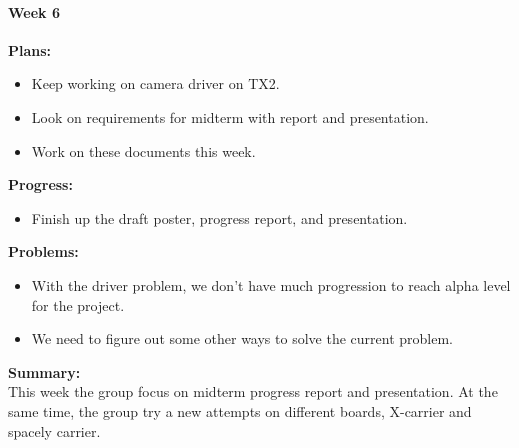 \paragraph{Week 6}
\begin{adjustwidth}{2.5em}{0pt}
    \vspace{-0.5cm}\textbf{Plans:}
    \vspace{-0.5cm}
    \begin{itemize}
        \item Keep working on camera driver on TX2. 
        \item Look on requirements for midterm with report and presentation.
        \item Work on these documents this week. 
    \end{itemize} 
    \vspace{-0.3cm}\textbf{Progress:}
    \vspace{-0.5cm}
    \begin{itemize}
        \item Finish up the draft poster, progress report, and presentation. 
    \end{itemize} 
    \vspace{-0.3cm}\textbf{Problems:}
    \vspace{-0.5cm}
    \begin{itemize}
        \item With the driver problem, we don't have much progression to reach alpha level for the project.
        \item We need to figure out some other ways to solve the current problem.
    \end{itemize}  
    \vspace{-0.3cm}\noindent\textbf{Summary:}\\
    \noindent This week the group focus on midterm progress report and presentation. At the same time, the group 
    try a new attempts on different boards, X-carrier and spacely carrier. \\
\end{adjustwidth} 

